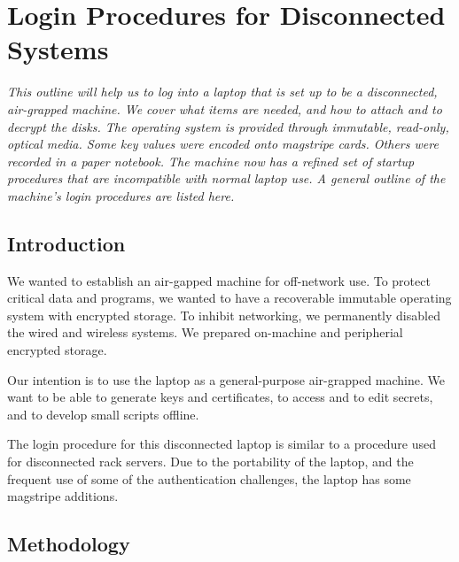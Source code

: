 \chapter{Login Procedures for Disconnected Systems}
\begin{center}\vspace{-0.5\baselineskip}\parbox{0.85\textwidth}{\small\itshape
This outline will help us to log into a laptop that is set up to be a disconnected, air-grapped machine.  We cover what items are needed, and how to attach and to decrypt the disks.  The \gls{operating system} is provided through immutable, read-only, optical media.  Some key values were encoded onto magstripe cards.  Others were recorded in a paper notebook.  The machine now has a refined set of startup procedures that are incompatible with normal laptop use.  A general outline of the machine's login procedures are listed here.\par}\end{center}

\section{Introduction}

We wanted to establish an air-gapped machine for off-network use.  To protect critical data and programs, we wanted to have a recoverable immutable  \gls{operating system} with encrypted storage.  To inhibit networking, we permanently disabled the wired and wireless systems.  We prepared on-machine and peripherial encrypted storage.

Our intention is to use the laptop as a general-purpose air-grapped machine.  We want to be able to generate keys and certificates, to access and to edit secrets, and to develop small scripts offline.

The login procedure for this disconnected laptop is similar to a procedure used for disconnected rack servers.  Due to the portability of the laptop, and the frequent use of some of the  \gls{authentication} challenges, the laptop has some magstripe additions.



\section{Methodology}



